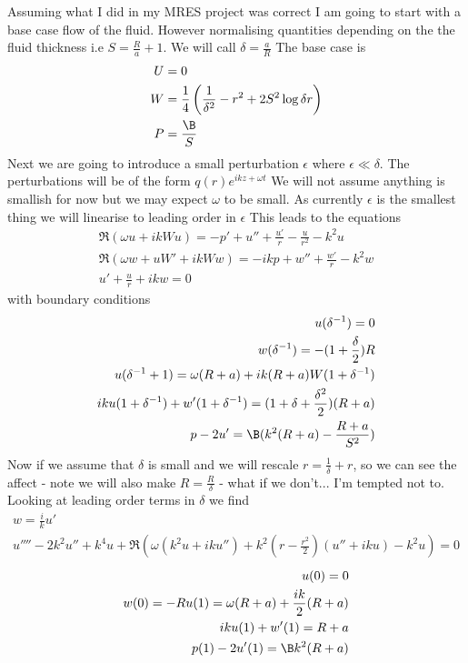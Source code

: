 \documentclass[12pt]{article}
\begin{document}
Assuming what I did in my MRES project was correct I am going to start with a base case flow of the fluid. 
However normalising quantities depending on the the fluid thickness
i.e $S = \frac{R}{a} + 1$. We will call $\delta = \frac{a}{R}$ The base case is 
\begin{align}
U&=0\\
W&=\frac{1}{4}\left(\frac{1}{\delta^2}-r^2+2S^2\log\delta r\right)\\
P&=\frac{\B}{S}
\end{align}
Next we are going to introduce a small perturbation $\epsilon$ where $\epsilon\ll \delta$. The perturbations will be of the form $q(r)e^{ikz + \omega t} $ We will not assume anything is smallish for now but we may expect $\omega$ to be small. As currently $\epsilon$ is the smallest thing we will linearise to leading order in $\epsilon$
This leads to the equations
\begin{align}
\Re(\omega u + ik W u) = - p' + u'' +\frac{u'}{r}- \frac{u}{r^2} - k^2 u \\
\Re(\omega w + u W'+ ikW w ) = -ikp + w'' + \frac{w'}{r}- k^2 w\\
u' + \frac{u}{r} + ik w = 0 
\end{align}
with boundary conditions
\begin{align}
u(\delta^{-1}) = 0\\
w(\delta^{-1}) = -(1 + \frac{\delta}{2}) R\\
u(\delta^{-1} + 1) = \omega (R+ a) + ik (R+ a) W(1 + \delta^{-1})\\
ik u(1+\delta^{-1})+w'(1 + \delta^{-1}) =  (1+\delta+\frac{\delta^2}{2})(R+ a)\\
p - 2 u'  = \B(k^2(R+a) - \frac{R+ a}{S^2}) 
\end{align}
Now if we assume that $\delta$ is small and we will rescale $r = \frac{1}{\delta} + r$, so we can see the affect - note we will also make $R = \frac{R}{\delta}$ - what if we don't... I'm tempted not to.
Looking at leading order terms in $\delta$ we find \begin{align}
w = \frac{i}{k}u'\\
u''''-2k^2 u'' +k^4 u + \Re\left(\omega(k^2u +iku'')+k^2\left(r-\frac{r^2}{2}\right)(u''+iku)-k^2 u\right)= 0 
\end{align}
\begin{align}
u(0) = 0\\
w(0) = -R
u(1) = \omega(R+a) + \frac{ik}{2}(R+a)\\
ik u(1) + w'(1) = R + a\\
 p(1) - 2u'(1) = \B k^2(R+a) \end{align}
\end{document}
